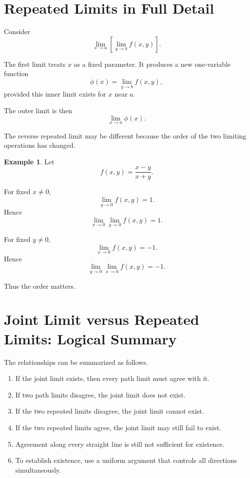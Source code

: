 \documentclass[11pt,oneside]{book}
\theoremstyle{studentthm}
\theoremstyle{definition}
\newtheorem{example}[theorem]{Example}
\begin{document}
\section{Repeated Limits in Full Detail}

Consider
\[
\lim_{x\to a}
\left[
\lim_{y\to b}f(x,y)
\right].
\]

The first limit treats \(x\) as a fixed parameter. It produces a new
one-variable function
\[
\phi(x)=\lim_{y\to b}f(x,y),
\]
provided this inner limit exists for \(x\) near \(a\).

The outer limit is then
\[
\lim_{x\to a}\phi(x).
\]

The reverse repeated limit may be different because the order of the
two limiting operations has changed.

\begin{example}
Let
\[
f(x,y)=\frac{x-y}{x+y}.
\]

For fixed \(x\ne0\),
\[
\lim_{y\to0}f(x,y)=1.
\]
Hence
\[
\lim_{x\to0}\lim_{y\to0}f(x,y)=1.
\]

For fixed \(y\ne0\),
\[
\lim_{x\to0}f(x,y)=-1.
\]
Hence
\[
\lim_{y\to0}\lim_{x\to0}f(x,y)=-1.
\]

Thus the order matters.
\end{example}

\section{Joint Limit versus Repeated Limits: Logical Summary}

The relationships can be summarized as follows.

\begin{enumerate}
\item If the joint limit exists, then every path limit must agree with
it.

\item If two path limits disagree, the joint limit does not exist.

\item If the two repeated limits disagree, the joint limit cannot
exist.

\item If the two repeated limits agree, the joint limit may still fail
to exist.

\item Agreement along every straight line is still not sufficient for
existence.

\item To establish existence, use a uniform argument that controls all
directions simultaneously.
\end{enumerate}
\end{document}
